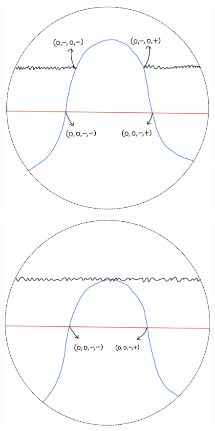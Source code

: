 \begin{definition}
\begin{enumerate}
\begin{itemize}
\begin{figure}[H]
    \centering
    \includegraphics[scale = 0.45]{diagrams/lemma2/17.png} 
    \caption{}
    \label{fig:your-label}
\end{figure}
\begin{figure}[H]
    \centering
    \includegraphics[scale = 0.45]{diagrams/lemma2/18.png} 

\end{figure}
\end{itemize}
\end{enumerate}
\end{definition}
